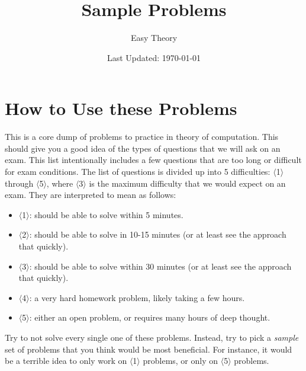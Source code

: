 \documentclass[a4paper,american,12pt]{book}
\title{Sample Problems}
\author{Easy Theory}
\date{Last Updated: \today}
\newcommand{\Level}[1]{{\color{blue} $\langle$#1$\rangle$}}
\begin{document}
\maketitle
\frontmatter  %
\section*{How to Use these Problems}
This is a core dump of problems to practice in theory of computation.
This should give you a good idea of the types of questions that we will ask on an exam.
This list intentionally includes a few questions that are too long or difficult for exam conditions.
The list of questions is divided up into 5 difficulties: \Level{1} through \Level{5}, where \Level{3} is the maximum difficulty that we would expect on an exam. They are interpreted to mean as follows:
\begin{itemize}
	\item \Level{1}: should be able to solve within 5 minutes.
	\item \Level{2}: should be able to solve in 10-15 minutes (or at least see the approach that quickly).
	\item \Level{3}: should be able to solve within 30 minutes (or at least see the approach that quickly).
	\item \Level{4}: a very hard homework problem, likely taking a few hours.
	\item \Level{5}: either an open problem, or requires many hours of deep thought.
\end{itemize}

Try to not solve every single one of these problems. 
Instead, try to pick a \emph{sample} set of problems that you think would be most beneficial.
For instance, it would be a terrible idea to only work on \Level{1} problems, or only on \Level{5} problems. 
\end{document}
